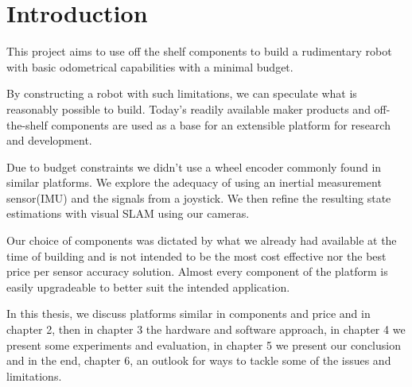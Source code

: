 \documentclass[class=report, crop=false]{standalone}
\begin{document}
\chapter{Introduction}\label{cha:introduction}
\pagestyle{scrheadings}
This project aims to use off the shelf components to build a rudimentary robot with basic odometrical capabilities with a minimal budget.

By constructing a robot with such limitations, we can speculate what is reasonably possible to build. Today's readily available maker products and off-the-shelf components are used as a base for an extensible platform for research and development.

Due to budget constraints we didn't use a wheel encoder commonly found in similar platforms. We explore the adequacy of using an inertial measurement sensor(IMU) and the signals from a joystick. We then refine the resulting state estimations with visual SLAM using our cameras.

Our choice of components was dictated by what we already had available at the time of building and is not intended to be the most cost effective nor the best price per sensor accuracy solution. Almost every component of the platform is  easily upgradeable to better suit the intended application.

In this thesis, we discuss platforms similar in components and price and in chapter 2, then in chapter 3 the hardware and software approach, in chapter 4 we present some experiments and evaluation, in chapter 5 we present our conclusion and in the end, chapter 6, an outlook for ways to tackle some of the issues and limitations.
\end{document}
